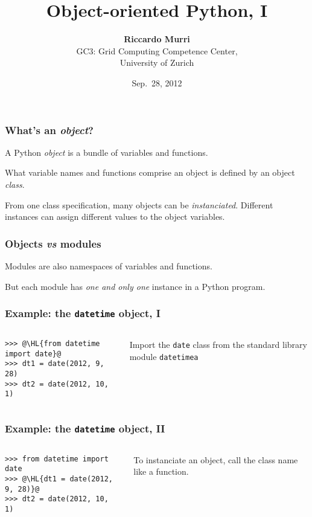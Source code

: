 \documentclass[english,serif,mathserif,xcolor=pdftex,dvipsnames,table]{beamer}
\title[OOP]{%
  Object-oriented Python, I
}
\author[R. Murri]{%
  \textbf{Riccardo Murri} \\
  GC3: Grid Computing Competence Center, \\
  University of Zurich
}
\date{Sep.~28, 2012}
\begin{document}
\maketitle


\begin{frame}
  \frametitle{What's an \emph{object}?}
  A Python \emph{object} is a bundle of variables and functions.

  \+ 
  What variable names and functions comprise an object is defined
  by an object \emph{class}.

  \+ 
  From one class specification, many objects can be
  \emph{instanciated}.  Different instances can assign different
  values to the object variables.
\end{frame}


\begin{frame}
  \frametitle{Objects \emph{vs} modules}

  Modules are also namespaces of variables and functions.

  \+ 
  But each module has \emph{one and only one} instance in a Python
  program.
\end{frame}


\begin{frame}[fragile]
  \frametitle{Example: the \texttt{datetime} object, I}
  \begin{columns}[c]
    \begin{column}{0.5\textwidth}
\begin{lstlisting}
>>> @\HL{from datetime import date}@
>>> dt1 = date(2012, 9, 28)
>>> dt2 = date(2012, 10, 1)
\end{lstlisting}
    \end{column}
    \begin{column}{0.45\textwidth}
      \raggedleft 
      Import the \texttt{date} class from the standard
      library module \texttt{datetimea}
    \end{column}
  \end{columns}
\end{frame}


\begin{frame}[fragile]
  \frametitle{Example: the \texttt{datetime} object, II}
  \begin{columns}[c]
    \begin{column}{0.5\textwidth}
\begin{lstlisting}
>>> from datetime import date
>>> @\HL{dt1 = date(2012, 9, 28)}@
>>> dt2 = date(2012, 10, 1)
\end{lstlisting}
    \end{column}
    \begin{column}{0.5\textwidth}
      \raggedleft 
      To instanciate an object, call the class name like a
      function.
    \end{column}
  \end{columns}
\end{frame}
\end{document}
